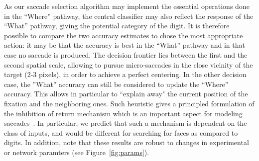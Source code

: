 As our saccade selection algorithm may implement the essential operations done in the ``Where'' pathway, the central classifier may also reflect the response of the ``What'' pathway,
giving the potential category of the digit. %
It is therefore possible to compare the two accuracy estimates to chose the most appropriate action: it may be that the  accuracy is best in the ``What'' pathway and in that case no saccade is produced.
The decision frontier lies between the first and the second spatial scale, allowing to pursue micro-saccades in the close vicinity of the target (2-3 pixels), in order to achieve a perfect centering.
In the other decision case, the ''What'' accuracy can still be considered to update the ``Where'' accuracy.
This allows in particular to ``explain away" the current position of the fixation and the neighboring ones.
Such heuristic gives a principled formulation of the inhibition of return mechanism which is an important aspect for modeling saccades~\citep{Itti01}. In particular, we predict that such a mechanism is dependent on the class of inputs, and would be different for searching for faces as compared to digits.
\fi
{}\ICANN
In addition, note that these results are robust to changes in experimental or network paramters (see Figure~\ref{fig:params}).
\else

